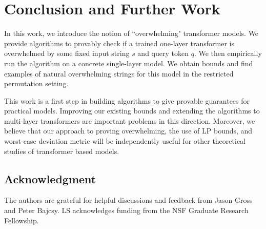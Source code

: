 \section{Conclusion and Further Work}
\label{sec:conclusion}
In this work, we introduce the notion of ``overwhelming" transformer models.
We provide algorithms to provably check if a trained one-layer transformer is overwhelmed by some fixed input string $s$ and query token $q$.
We then empirically run the algorithm on a concrete single-layer model.
We obtain bounds and find examples of natural overwhelming strings for this model in the restricted permutation setting.

This work is a first step in building algorithms to give provable guarantees for practical models.
Improving our existing bounds and extending the algorithms to multi-layer transformers are important problems in this direction.
Moreover, we believe that our approach to proving overwhelming, the use of LP bounds, and worst-case deviation metric will be independently useful for other theoretical studies of transformer based models.

\subsection*{Acknowledgment}
The authors are grateful for helpful discussions and feedback from Jason Gross and Peter Bajcsy.
LS acknowledges funding from the NSF Graduate Research Fellowship.

